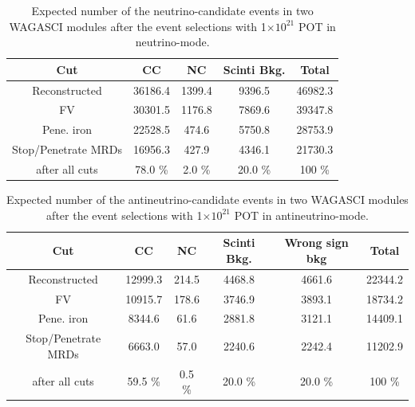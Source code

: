\begin{table}[htb]
  \begin{center}
    \caption{Expected number of the neutrino-candidate events in two WAGASCI modules after the event selections with 1$\times 10^{21}$ POT in neutrino-mode.}
    \begin{tabular}{c|ccc|c} \hline
Cut   & CC & NC & Scinti Bkg. & Total \\ \hline
Reconstructed & 36186.4 & 1399.4 & 9396.5 & 46982.3 \\
FV & 30301.5 & 1176.8 & 7869.6 & 39347.8 \\
Pene. iron & 22528.5 & 474.6 & 5750.8 & 28753.9 \\
Stop/Penetrate MRDs & 16956.3 & 427.9 & 4346.1 & 21730.3 \\ \hline
after all cuts & 78.0 \% & 2.0 \% & 20.0 \% & 100 \% \\
\hline
    \end{tabular}
    \label{tab:expected_num_events_neutrino_beam}
  \end{center}
\end{table}

\begin{table}[htb]
  \begin{center}
    \caption{Expected number of the antineutrino-candidate events in two WAGASCI modules after the event selections with 1$\times 10^{21}$ POT in antineutrino-mode.}
    \begin{tabular}{c|cccc|c} \hline
 Cut   & CC & NC & Scinti Bkg. & Wrong sign bkg & Total \\ \hline
Reconstructed & 12999.3 & 214.5 & 4468.8 & 4661.6 & 22344.2 \\ 
FV & 10915.7 & 178.6 & 3746.9 & 3893.1 & 18734.2 \\ 
Pene. iron & 8344.6 & 61.6 & 2881.8 & 3121.1 & 14409.1 \\ 
Stop/Penetrate MRDs & 6663.0 & 57.0 & 2240.6 & 2242.4 & 11202.9 \\ \hline
after all cuts & 59.5 \% & 0.5 \% & 20.0 \% &  20.0 \% & 100 \% \\
\hline
    \end{tabular}
    \label{tab:expected_num_events_antineutrino_beam}
  \end{center}
\end{table}

